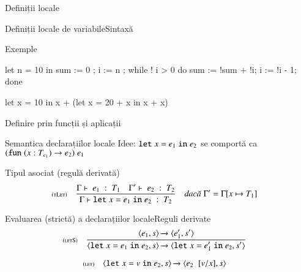 \documentclass[xcolor=pdftex,romanian,colorlinks]{beamer}
\begin{document}
\begin{section}{Definiții locale}
\begin{frame}[fragile]{Definiții locale de variabile}{Sintaxă}

\vfill 
\begin{block}{Exemple}
\begin{minipage}[t]{.35\columnwidth}
\begin{asciiml}
let n = 10 in
  sum := 0 ;
  i := n ;
  while ! i > 0 do
     sum  := !sum + !i;
     i := !i - 1;
  done
\end{asciiml}
\end{minipage}
\hfill\begin{minipage}[t]{.55\columnwidth}
\begin{asciiml}
let x = 10 in
   x + (let x = 20 + x in 
          x + x)
\end{asciiml}
\end{minipage}
\end{block}
\end{frame}

\begin{frame}{Definire prin funcții și aplicații}
\begin{block}{Semantica declarațiilor locale}
Idee: \(\mathrel{\text{\ttfamily let}} x = e_1 \mathrel{\text{\ttfamily in}} e_2\) se comportă ca \((\mathrel{\text{\ttfamily fun}} (x : T_{e_1}) \rightarrow e_2)\; e_1\)
\end{block}
\vfill
\begin{block}{Tipul asociat (regulă derivată)}
\[\reg[tLet]{\tjud{\Slet x = e_1 \Sin e_2}{T_2}}{\tjud{e_1}{T_1} \si \tjud[\Gamma']{e_2}{T_2}}{\Gamma' = \Gamma[x\mapsto T_1]}\]
\end{block}
\end{frame}

\begin{frame}{Evaluarea (strictă) a declarațiilor locale}{Reguli derivate}
\[\reg[letS]{\Ss{\c{\Slet x = e_1 \Sin e_2,s}}{\c{\Slet x = e_1' \Sin e_2,s'}}}{\Ss{\c{e_1,s}}{\c{e_1',s'}}}{}\]

\[\reg[let]{\Ss{\c{\Slet x = v \Sin e_2,s}}{\c{\substapp{e_2}{\subst{\substpair{v}{x}}},s}}}{}{}\]
\end{frame}


\end{section}
\end{document}
